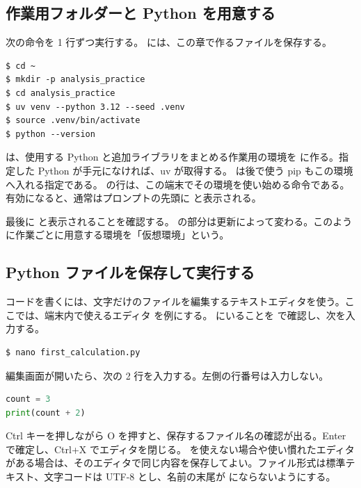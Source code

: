 \subsection{作業用フォルダーと Python を用意する}

次の命令を 1 行ずつ実行する。 には、この章で作るファイルを保存する。

\begin{lstlisting}[numbers=none, xleftmargin=2\zw]
$ cd ~
$ mkdir -p analysis_practice
$ cd analysis_practice
$ uv venv --python 3.12 --seed .venv
$ source .venv/bin/activate
$ python --version
\end{lstlisting}

 は、使用する Python と追加ライブラリをまとめる作業用の環境を  に作る。指定した Python が手元になければ、uv が取得する。 は後で使う pip もこの環境へ入れる指定である。 の行は、この端末でその環境を使い始める命令である。有効になると、通常はプロンプトの先頭に  と表示される。

最後に  と表示されることを確認する。 の部分は更新によって変わる。このように作業ごとに用意する環境を「仮想環境」という。

\subsection{Python ファイルを保存して実行する}

コードを書くには、文字だけのファイルを編集するテキストエディタを使う。ここでは、端末内で使えるエディタ  を例にする。 にいることを  で確認し、次を入力する。

\begin{lstlisting}[numbers=none, xleftmargin=2\zw]
$ nano first_calculation.py
\end{lstlisting}

編集画面が開いたら、次の 2 行を入力する。左側の行番号は入力しない。

\begin{lstlisting}[language=Python, title={first\_calculation.py}]
count = 3
print(count + 2)
\end{lstlisting}

Ctrl キーを押しながら O を押すと、保存するファイル名の確認が出る。Enter で確定し、Ctrl+X でエディタを閉じる。 を使えない場合や使い慣れたエディタがある場合は、そのエディタで同じ内容を保存してよい。ファイル形式は標準テキスト、文字コードは UTF-8 とし、名前の末尾が  にならないようにする。

